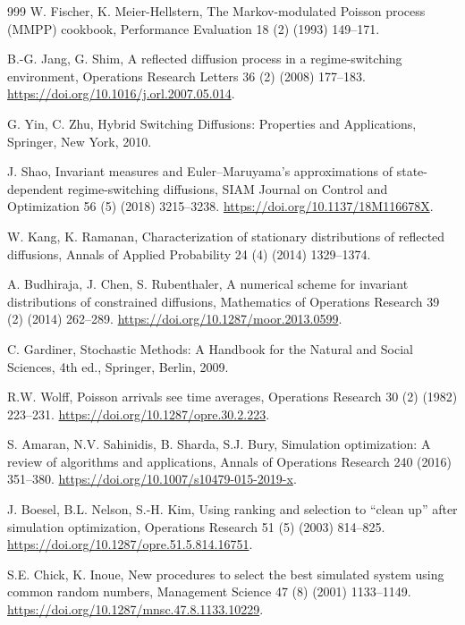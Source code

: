 \documentclass[futureinternet,article,submit,moreauthors]{Definitions/mdpi}
\begin{document}
\begin{thebibliography}{999}
W. Fischer, K. Meier-Hellstern,
The Markov-modulated Poisson process (MMPP) cookbook,
Performance Evaluation 18 (2) (1993) 149--171.

B.-G. Jang, G. Shim,
A reflected diffusion process in a regime-switching environment,
Operations Research Letters 36 (2) (2008) 177--183.
\newblock \url{https://doi.org/10.1016/j.orl.2007.05.014}.

G. Yin, C. Zhu,
Hybrid Switching Diffusions: Properties and Applications,
Springer, New York, 2010.

J. Shao,
Invariant measures and Euler--Maruyama's approximations of
state-dependent regime-switching diffusions,
SIAM Journal on Control and Optimization 56 (5) (2018) 3215--3238.
\newblock \url{https://doi.org/10.1137/18M116678X}.

W. Kang, K. Ramanan,
Characterization of stationary distributions of reflected diffusions,
Annals of Applied Probability 24 (4) (2014) 1329--1374.

A. Budhiraja, J. Chen, S. Rubenthaler,
A numerical scheme for invariant distributions of constrained diffusions,
Mathematics of Operations Research 39 (2) (2014) 262--289.
\newblock \url{https://doi.org/10.1287/moor.2013.0599}.

C. Gardiner,
Stochastic Methods: A Handbook for the Natural and Social Sciences, 4th ed.,
Springer, Berlin, 2009.

R.W. Wolff,
Poisson arrivals see time averages,
Operations Research 30 (2) (1982) 223--231.
\newblock \url{https://doi.org/10.1287/opre.30.2.223}.

S. Amaran, N.V. Sahinidis, B. Sharda, S.J. Bury,
Simulation optimization: A review of algorithms and applications,
Annals of Operations Research 240 (2016) 351--380.
\newblock \url{https://doi.org/10.1007/s10479-015-2019-x}.

J. Boesel, B.L. Nelson, S.-H. Kim,
Using ranking and selection to ``clean up'' after simulation optimization,
Operations Research 51 (5) (2003) 814--825.
\newblock \url{https://doi.org/10.1287/opre.51.5.814.16751}.

S.E. Chick, K. Inoue,
New procedures to select the best simulated system using common random numbers,
Management Science 47 (8) (2001) 1133--1149.
\newblock \url{https://doi.org/10.1287/mnsc.47.8.1133.10229}.


\end{thebibliography}
\end{document}
